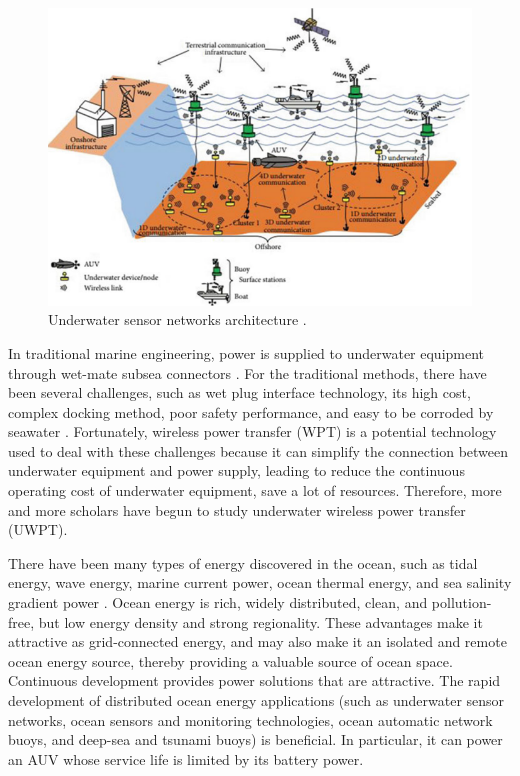 \begin{figure}[htbp]
    \centering
    \includegraphics[width=0.7\linewidth]{images/1_underwater_sensor_networks.png}
    \caption{Underwater sensor networks architecture \cite{Nayyar}.}
    \label{fig:underwater sensor networks}
\end{figure}

In traditional marine engineering, power is supplied to underwater equipment through wet-mate subsea connectors \cite{Painter2006}.
For the traditional methods, there have been several challenges, such as wet plug interface technology, its high cost, complex docking method, poor safety performance, and easy to be corroded by seawater \cite{Painter2006, Tianlei_Wang_2016}.
Fortunately, wireless power transfer (WPT) is a potential technology used to deal with these challenges because it can simplify the connection between underwater equipment and power supply, leading to reduce the continuous operating cost of underwater equipment, save a lot of resources.
Therefore, more and more scholars have begun to study underwater wireless power transfer (UWPT).\cite{Song, Orekan, Yang2019, Hasaba2019, Orekan2018}

There have been many types of energy discovered in the ocean, such as tidal energy, wave energy, marine current power, ocean thermal energy, and sea salinity gradient power \cite{Capareda2019, Drew2009, Vlachogiannis2014, Zeng2020}.
Ocean energy is rich, widely distributed, clean, and pollution-free, but low energy density and strong regionality.
These advantages make it attractive as grid-connected energy, and may also make it an isolated and remote ocean energy source, thereby providing a valuable source of ocean space. Continuous development provides power solutions that are attractive. The rapid development of distributed ocean energy applications (such as underwater sensor networks, ocean sensors and monitoring technologies, ocean automatic network buoys, and deep-sea and tsunami buoys) is beneficial. In particular, it can power an AUV whose service life is limited by its battery power.


